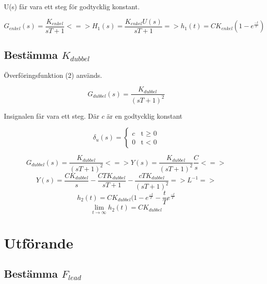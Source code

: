 \documentclass[a4paper]{article}
\begin{document}
U(s) får vara ett steg för godtycklig konstant.

\begin{equation*}
  G_{enkel}(s)=\frac{K_{enkel}}{sT+1} <=>   
  H_{1}(s)=\frac{K_{enkel}U(s)}{sT+1} =>
  h_{1}(t) = CK_{enkel}(1-e^{\frac{-t}{T}})
\end{equation*}

\subsection{Bestämma $K_{dubbel}$}

Överföringsfunktion (2) används.

\begin{equation}
  G_{dubbel}(s)=\frac{K_{dubbel}}{(sT+1)^2}
\end{equation}

Insignalen får vara ett steg. Där $c$ är en godtycklig konstant

\begin{equation*}
\delta_{u}(s)=\begin{cases}
  c & \text{t $\geq$ 0}  \\
  0 & \text{t $<$ 0} 
\end{cases}
\end{equation*}


\begin{equation*}
  G_{dubbel}(s)=\frac{K_{dubbel}}{(sT+1)^2} <=> Y(s)=\frac{K_{dubbel}}{(sT+1)^2} \frac{C}{s} <=>
\end{equation*}
\begin{equation*}
  Y(s)=\frac{CK_{dubbel}}{s}-\frac{CTK_{dubbel}}{sT+1}-\frac{cTK_{dubbel}}{(sT+1)^2} => L^{-1} =>
\end{equation*}
\begin{equation}
  h_{2}(t)=CK_{dubbel}(1-e^{\frac{-t}{T}}-\frac{t}{T}e^{\frac{-t}{T}}
\end{equation}
\begin{equation}
  \lim_{t \to \infty} h_{2}(t)=CK_{dubbel}
\end{equation}


\section{Utförande}



\subsection{Bestämma $F_{lead}$}
\end{document}
